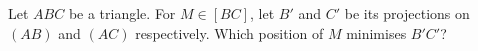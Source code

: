 Let $ABC$ be a triangle. For $M \in [BC]$, let $B'$ and $C'$ be its projections on $(AB)$ and $(AC)$ respectively. Which position of $M$ minimises $B'C'$?
